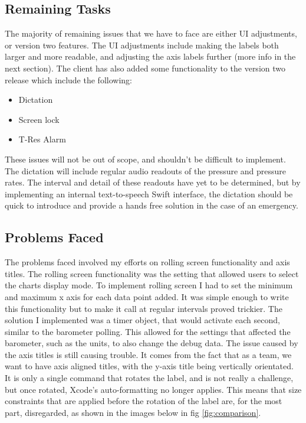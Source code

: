 \documentclass[onecolumn, draftclsnofoot,10pt, compsoc]{IEEEtran}
\begin{document}
\subsection{Remaining Tasks}
The majority of remaining issues that we have to face are either UI adjustments, or version two features.
The UI adjustments include making the labels both larger and more readable, and adjusting the axis labels further (more info in the next section).
The client has also added some functionality to the version two release which include the following:

\begin{itemize}
  \item Dictation
  \item Screen lock
  \item T-Res Alarm
\end{itemize}

These issues will not be out of scope, and shouldn't be difficult to implement.
The dictation will include regular audio readouts of the pressure and pressure rates.
The interval and detail of these readouts have yet to be determined, but by implementing an internal text-to-speech Swift interface, the dictation should be quick to introduce and provide a hands free solution in the case of an emergency.

\subsection{Problems Faced}

The problems faced involved my efforts on rolling screen functionality and axis titles.
The rolling screen functionality was the setting that allowed users to select the charts display mode.
To implement rolling screen I had to set the minimum and maximum x axis for each data point added.
It was simple enough to write this functionality but to make it call at regular intervals proved trickier.
The solution I implemented was a timer object, that would activate each second, similar to the barometer polling.
This allowed for the settings that affected the barometer, such as the units, to also change the debug data.
The issue caused by the axis titles is still causing trouble.
It comes from the fact that as a team, we want to have axis aligned titles, with the y-axis title being vertically orientated.
It is only a single command that rotates the label, and is not really a challenge, but once rotated, Xcode's auto-formatting no longer applies.
This means that size constraints that are applied before the rotation of the label are, for the most part, disregarded, as shown in the images below in fig \ref{fig:comparison}.
\end{document}
